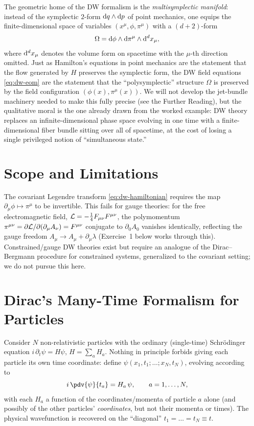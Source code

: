 The geometric home of the DW formalism is the \emph{multisymplectic manifold}:
instead of the symplectic $2$-form $\mathrm{d} q\wedge \mathrm{d} p$ of point mechanics, one
equips the finite-dimensional space of variables $(x^\mu,\phi,\pi^\mu)$ with a
$(d+2)$-form
\begin{equation}
\Omega = \mathrm{d}\phi\wedge \mathrm{d}\pi^\mu \wedge \mathrm{d}^{d}x_\mu ,
\end{equation}
where $\mathrm{d}^d x_\mu$ denotes the volume form on spacetime with the $\mu$-th direction omitted. Just as Hamilton's equations in point mechanics are the statement that the flow generated by $H$ preserves the symplectic form, the DW field equations \eqref{eq:dw-eom} are the statement that the ``polysymplectic'' structure $\Omega$ is preserved by the field configuration $(\phi(x),\pi^\mu(x))$. We will not develop the jet-bundle machinery needed to make this fully precise (see the Further Reading), but the qualitative moral is the one already drawn from the worked example: DW theory replaces an infinite-dimensional phase space evolving in one time with a finite-dimensional fiber bundle sitting over all of spacetime, at the cost of losing a single privileged notion of ``simultaneous state.''

\section{Scope and Limitations}
\label{sec:scope}

The covariant Legendre transform \eqref{eq:dw-hamiltonian} requires the map
$\partial_\mu\phi \mapsto \pi^\mu$ to be invertible. This fails for gauge
theories: for the free electromagnetic field,
$\mathcal{L}=-\tfrac14F_{\mu\nu}F^{\mu\nu}$, the polymomentum
$\pi^{\mu\nu}=\partial\mathcal{L}/\partial(\partial_\mu A_\nu)=F^{\mu\nu}$ conjugate
to $\partial_0A_0$ vanishes identically, reflecting the gauge freedom $A_\mu\to
A_\mu+\partial_\mu\lambda$ (Exercise~1 below works through this).
Constrained/gauge DW theories exist but require an analogue of the
Dirac--Bergmann procedure for constrained systems, generalized to the covariant
setting; we do not pursue this here.

\section{Dirac's Many-Time Formalism for Particles}
\label{sec:dirac-multitime}

Consider $N$ non-relativistic particles with the ordinary (single-time)
Schr\"odinger equation $i\,\partial_t\psi = H\psi$, $H=\sum_a H_a$. Nothing in
principle forbids giving each particle its own time coordinate: define
$\psi(x_1,t_1;\dots;x_N,t_N)$, evolving according to
\begin{equation}
i\,\pdv{\psi}{t_a} = H_a\,\psi , \qquad a=1,\dots,N,
\label{eq:multitime-schrodinger}
\end{equation}
with each $H_a$ a function of the coordinates/momenta of particle $a$ alone
(and possibly of the other particles' \emph{coordinates}, but not their momenta
or times). The physical wavefunction is recovered on the ``diagonal''
$t_1=\dots=t_N\equiv t$.

